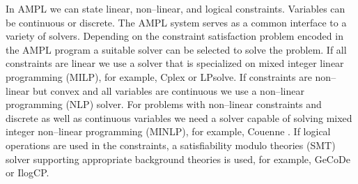 \documentclass[runningheads,a4paper]{llncs}%
\begin{document}
In AMPL we can state linear, non--linear, and logical constraints. Variables can be continuous or discrete. The AMPL system serves as a common interface to a variety of solvers. Depending on the constraint satisfaction problem encoded in the AMPL program a suitable solver can be selected to solve the problem. If all constraints are linear we use a solver that is specialized on mixed integer linear programming (MILP), for example, Cplex or LPsolve\cite{lpsolve}. If constraints are non--linear but convex and all variables are continuous we use a non--linear programming (NLP) solver. For problems with non--linear constraints and discrete as well as continuous variables we need a solver capable of solving mixed integer non--linear programming (MINLP), for example, Couenne \cite{Belotti09couenne}. If logical operations are used in the constraints, a satisfiability modulo theories (SMT) solver supporting appropriate background theories is used, for example, GeCoDe or IlogCP.%
\end{document}

